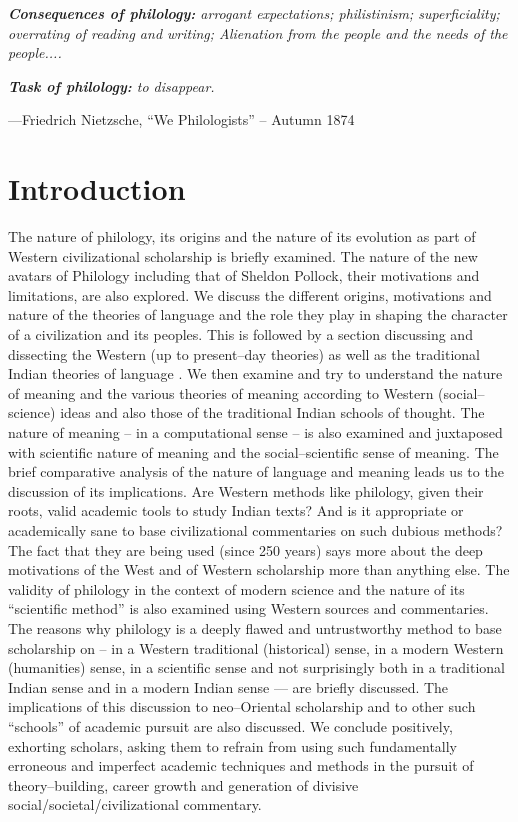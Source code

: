 \textit{\textbf{Consequences of philology:} arrogant expectations; philistinism; superficiality; overrating of reading and writing; Alienation from the people and the needs of the people.... }

\textit{\textbf{Task of philology:} to disappear.}

—Friedrich Nietzsche, “We Philologists” – Autumn 1874


\section*{Introduction}

The nature of philology, its origins and the nature of its evolution as part of Western civilizational scholarship is briefly examined. The nature of the new avatars of Philology including that of Sheldon Pollock, their motivations and limitations, are also explored. We discuss the different origins, motivations and nature of the theories of language and the role they play in shaping the character of a civilization and its peoples. This is followed by a section discussing and dissecting the Western (up to present–day theories) as well as the traditional Indian theories of language . We then examine and try to understand the nature of meaning and the various theories of meaning  according to Western (social–science) ideas and also those of the traditional Indian schools of thought. The nature of meaning – in a computational sense – is also examined and juxtaposed with scientific nature of meaning and the social–scientific sense of meaning. The brief comparative analysis of the nature of language and meaning leads us to the discussion of its implications. Are Western methods like philology, given their roots, valid academic tools to study Indian texts? And is it appropriate or academically sane to base civilizational commentaries on such dubious methods? The fact that they are being used (since 250 years) says more about the deep motivations of the West and of Western scholarship more than anything else. The validity of philology in the context of modern science and the nature of its “scientific method” is also examined using Western sources and commentaries. The reasons why philology is a deeply flawed and untrustworthy method to base scholarship on – in a Western traditional (historical) sense, in a modern Western (humanities) sense, in a scientific sense and not surprisingly both in a traditional Indian sense and in a modern Indian sense — are briefly discussed. The implications of this discussion to neo–Oriental scholarship and to other such “schools” of academic pursuit are also discussed. We conclude positively, exhorting scholars, asking them to refrain from using such fundamentally erroneous and imperfect academic techniques and methods in the pursuit of theory–building, career growth and generation of divisive social/societal/civilizational commentary.


